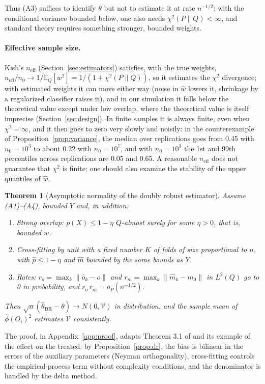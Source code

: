 \documentclass[twoside,11pt]{article}
\newcommand{\E}{\mathbb{E}}
\newcommand{\neff}{n_{\mathrm{eff}}}
\theoremstyle{plain}
\newtheorem{theorem}{Theorem}
\theoremstyle{definition}
\begin{document}
Thus (A3) suffices to identify $\theta$ but not to estimate it at rate $n^{-1/2}$: with the conditional variance bounded below, one also needs $\chi^2(P\|Q)<\infty$, and standard theory requires something stronger, bounded weights.

\paragraph{Effective sample size.} Kish's $\neff$ (Section~\ref{sec:estimators}) satisfies, with the true weights, $\neff/n_0\to1/\E_Q[w^2]=1/(1+\chi^2(P\|Q))$, so it estimates the $\chi^2$ divergence; with estimated weights it can move either way (noise in $\hat w$ lowers it, shrinkage by a regularized classifier raises it), and in our simulation it falls below the theoretical value except under low overlap, where the theoretical value is itself imprecise (Section~\ref{sec:design}). In finite samples it is always finite, even when $\chi^2=\infty$, and it then goes to zero very slowly and noisily: in the counterexample of Proposition~\ref{prop:variance}, the median over replications goes from 0.45 with $n_0=10^3$ to about 0.22 with $n_0=10^7$, and with $n_0=10^3$ the 1st and 99th percentiles across replications are 0.05 and 0.65. A reasonable $\neff$ does not guarantee that $\chi^2$ is finite; one should also examine the stability of the upper quantiles of $\hat w$.

\begin{theorem}[Asymptotic normality of the doubly robust estimator]\label{thm:normality}
Assume (A1)--(A4), bounded $Y$ and, in addition:
\begin{enumerate}
  \item \emph{Strong overlap:} $p(X)\le1-\eta$ $Q$-almost surely for some $\eta>0$, that is, bounded $w$.
  \item Cross-fitting by unit with a fixed number $K$ of folds of size proportional to $n$, with $\hat p\le1-\eta$ and $\hat m$ bounded by the same bounds as $Y$.
  \item \emph{Rates:} $r_o=\max_k\|\hat o_k-o\|$ and $r_m=\max_k\|\hat m_k-m_0\|$ in $L^2(Q)$ go to 0 in probability, and $r_o\,r_m=o_P(n^{-1/2})$.
\end{enumerate}
Then $\sqrt n(\hat\theta_{\mathrm{DR}}-\theta)\to N(0,\mathcal V)$ in distribution, and the sample mean of $\hat\phi(O_i)^2$ estimates $\mathcal V$ consistently.
\end{theorem}
The proof, in Appendix~\ref{app:proof}, adapts Theorem 3.1 of \citet{chernozhukov2018} and its example of the effect on the treated: by Proposition~\ref{prop:dr}, the bias is bilinear in the errors of the auxiliary parameters (Neyman orthogonality), cross-fitting controls the empirical-process term without complexity conditions, and the denominator is handled by the delta method.
\end{document}
